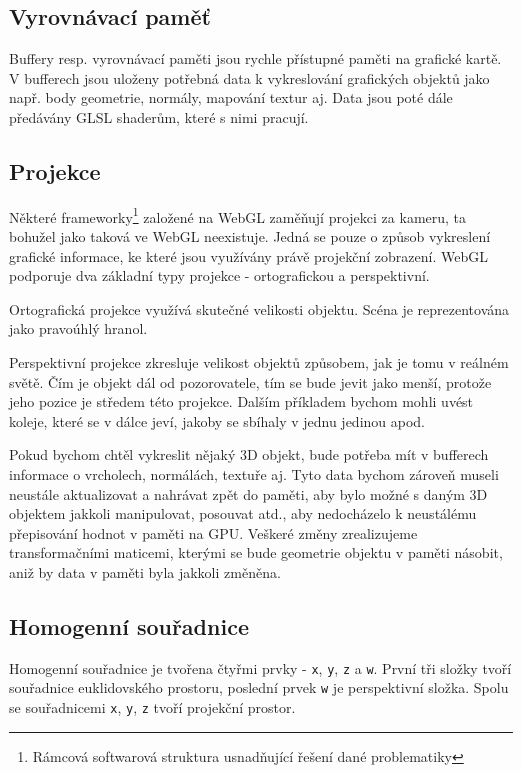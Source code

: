 \subsection{Vyrovnávací paměť}
Buffery resp. vyrovnávací paměti jsou rychle přístupné paměti na grafické kartě. V bufferech jsou  uloženy potřebná data k vykreslování grafických objektů jako např. body geometrie, normály, mapování textur aj. Data jsou poté dále předávány GLSL shaderům, které s nimi pracují.


\newpage

\subsection{Projekce}
Některé frameworky\footnote{Rámcová softwarová struktura usnadňující řešení dané problematiky} založené na WebGL zaměňují projekci za kameru, ta bohužel jako taková ve WebGL neexistuje. Jedná se pouze o způsob vykreslení grafické informace, ke které jsou využívány právě projekční zobrazení. WebGL podporuje dva základní typy projekce - ortografickou a perspektivní. 

Ortografická projekce využívá skutečné velikosti objektu. Scéna je reprezentována jako pravoúhlý hranol.

Perspektivní projekce zkresluje velikost objektů způsobem, jak je tomu v reálném světě. Čím je objekt dál od pozorovatele, tím se bude jevit jako menší, protože jeho pozice je středem této projekce. Dalším příkladem bychom mohli uvést koleje, které se v dálce jeví, jakoby se sbíhaly v jednu jedinou apod.
  
Pokud bychom chtěl vykreslit nějaký 3D objekt, bude potřeba mít v bufferech informace o vrcholech, normálách, textuře aj. Tyto data bychom zároveň museli neustále aktualizovat a nahrávat zpět do paměti, aby bylo možné s daným 3D objektem jakkoli manipulovat, posouvat atd., aby nedocházelo k neustálému přepisování hodnot v paměti na GPU. Veškeré změny zrealizujeme transformačními maticemi, kterými se bude geometrie objektu v paměti násobit, aniž by data v paměti byla jakkoli změněna.

\subsection{Homogenní souřadnice}
Homogenní souřadnice je tvořena čtyřmi prvky - \texttt{x}, \texttt{y}, \texttt{z} a \texttt{w}. První tři složky tvoří souřadnice euklidovského prostoru, poslední prvek \texttt{w} je perspektivní složka. Spolu se souřadnicemi \texttt{x}, \texttt{y}, \texttt{z} tvoří projekční prostor.\cite{WebGLbeg}


